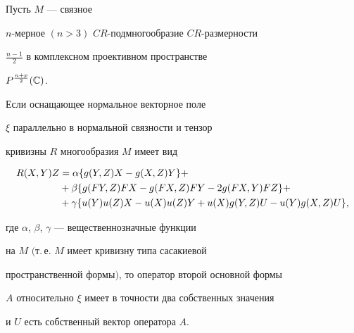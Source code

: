 \begin{lem}


Пусть  $M$ --- связное


$n$-мерное $(n>3)$  $CR$-подмногообразие $CR$-размерности


$\frac{n-1}{2}$ в комплексном проективном пространстве


$P^{\frac{n+p}{2}}(\Bbb C)$.


Если оснащающее нормальное векторное поле


$\xi$ параллельно в нормальной связности и тензор


кривизны $R$ многообразия $M$ имеет вид


\begin{align}


R(X,Y)Z&=\alpha\{g(Y,Z)X-g(X,Z)Y\}+\notag \\


&+\beta\{g(FY,Z)FX-g(FX,Z)FY-2g(FX,Y)FZ\}+\notag \\


&+\gamma\{u(Y)u(Z)X-u(X)u(Z)Y+u(X)g(Y,Z)U-u(Y)g(X,Z)U\},


\end{align}


где  $\alpha$, $\beta$, $\gamma$ --- вещественнозначные функции


на $M$ $($т.\,е. $M$ имеет кривизну типа сасакиевой


пространственной формы$)$, то оператор второй основной формы


$A$ относительно $\xi$ имеет в точности два собственных значения


и $U$ есть собственный вектор оператора $A$. 


\end{lem}





